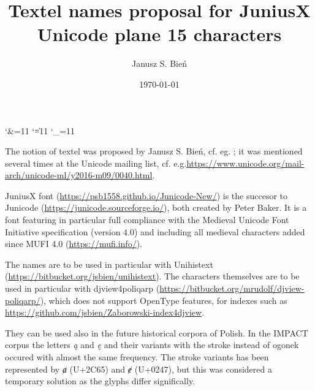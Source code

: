 \documentclass{article}
\begin{document}
% 
\title{Textel names proposal for JuniusX\\ Unicode plane 15 characters}

\author{Janusz S. Bień}

\date{\today}

\maketitle

\catcode`\&=11
\catcode`\|=11
\catcode`\_=11





The notion of textel was proposed by Janusz S. Bień,
cf. eg. %
\autocite{bc381}; it was mentioned several times at the Unicode
mailing list,
cf. e.g.\url{https://www.unicode.org/mail-arch/unicode-ml/y2016-m09/0040.html}.

JuniusX font (\url{https://psb1558.github.io/Junicode-New/}) is the
succesor to Junicode (\url{https://junicode.sourceforge.io/}),
both created by Peter Baker. It is a font featuring in particular full
compliance with the Medieval Unicode Font Initiative specification
(version 4.0) and including all medieval characters added
since MUFI 4.0 (\url{https://mufi.info/}).

The names are to be used in particular with \textsf{Unihistext}
(\url{https://bitbucket.org/jsbien/unihistext}).  The characters
themselves are to be used in particular with \textsf{djview4poliqarp}
(\url{https://bitbucket.org/mrudolf/djview-poliqarp/}), which does not
support OpenType features, for indexes such as
\url{https://github.com/jsbien/Zaborowski-index4djview}.

They can be used also in the future historical corpora of Polish.  In
the IMPACT corpus \autocite{bc289} the letters \textit{ą} and \textit{ę}
and their variants with the stroke instead of ogonek occured with
almost the same frequency. The stroke variants has been represented by
\textit{ⱥ} (U+2C65) and \textit{ɇ} (U+0247), but this was considered
 a temporary solution as the glyphs differ significally.
\end{document}
